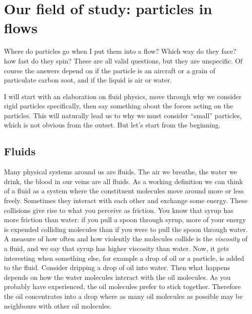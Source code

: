 \documentclass[thesis.tex]{subfiles}
\begin{document}
\section{Our field of study: particles in flows}\label{sec:context}

Where do particles go when I put them into a flow? Which way do they face? how fast do they spin? These are all valid questions, but they are unspecific. Of course the answers depend on if the particle is an aircraft or a grain of particulate carbon soot, and if the liquid is air or water. 

I will start with an elaboration on fluid physics, move through why we consider rigid particles specifically, then say something about the forces acting on the particles. This will naturally lead us to why we must consider ``small'' particles, which is not obvious from the outset. But let's start from the beginning.

\subsection*{Fluids}

Many physical systems around us are fluids. The air we breathe, the water we drink, the blood in our veins are all fluids. As a working definition we can think of a fluid as a system where the constituent molecules move around more or less freely. Sometimes they interact with each other and exchange some energy. These collisions give rise to what you perceive as friction. You know that syrup has more friction than water: if you pull a spoon through syrup, more of your energy is expended colliding molecules than if you were to pull the spoon through water. A measure of how often and how violently the molecules collide is the \emph{viscosity} of a fluid, and we say that syrup has higher viscosity than water. Now, it gets interesting when something else, for example a drop of oil or a particle, is added to the fluid. Consider dripping a drop of oil into water. Then what happens depends on how the water molecules interact with the oil molecules. As you probably have experienced, the oil molecules prefer to stick together. Therefore the oil concentrates into a drop where as many oil molecules as possible may be neighbours with other oil molecules.
\end{document}
